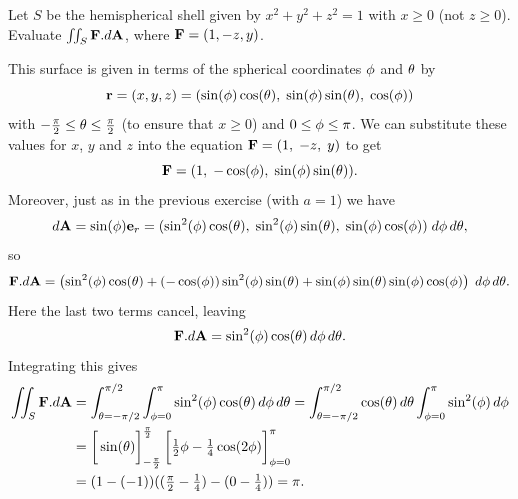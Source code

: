\documentclass[a4paper]{amsart}
\renewenvironment{solution}{\SolutionInline}{\endSolutionInline}
\begin{document}
\begin{exercise}
 Let $S$ be the hemispherical shell given by $x^2+y^2+z^2=1$ with
 $x\geq 0$ (not $z\geq 0$).  Evaluate $\iint_S\mathbf{F}.d\mathbf{A}$, where
 $\mathbf{F}=(1,-z,y)$.
\end{exercise}
\begin{solution}
 This surface is given in terms of the spherical coordinates $\phi$
 and $\theta$ by 
 \[ \mathbf{r} = (x,y,z) =
     (\sin(\phi)\cos(\theta),\;\sin(\phi)\sin(\theta),\;\cos(\phi))
 \]
 with $-\frac{\pi}{2}\leq\theta\leq\frac{\pi}{2}$ (to ensure that
 $x\geq 0$) and $0\leq\phi\leq\pi$.  We can substitute these values
 for $x$, $y$ and $z$ into the equation $\mathbf{F}=(1,\;-z,\;y)$ to get
 \[ \mathbf{F} = (1,\;-\cos(\phi),\;\sin(\phi)\sin(\theta)).
 \]
 Moreover, just as in the previous exercise (with $a=1$) we have 
 \[ d\mathbf{A}=\sin(\phi)\mathbf{e}_r
     = (\sin^2(\phi)\cos(\theta),\;
        \sin^2(\phi)\sin(\theta),\;
        \sin(\phi)\cos(\phi))\;d\phi\,d\theta,
 \]
 so 
 \[ \mathbf{F}.d\mathbf{A} = \left(
     \sin^2(\phi)\cos(\theta) + 
     (-\cos(\phi))\sin^2(\phi)\sin(\theta) +
     \sin(\phi)\sin(\theta)\sin(\phi)\cos(\phi)
    \right)\;d\phi\,d\theta.
 \]
 Here the last two terms cancel, leaving 
 \[ \mathbf{F}.d\mathbf{A}=\sin^2(\phi)\cos(\theta)\,d\phi\,d\theta. \]
 Integrating this gives
 \begin{align*}
  \iint_S\vF.d\vA
   &= \int_{\azi=-\pi/2}^{\pi/2}\int_{\zen=0}^\pi 
       \sin^2(\zen)\cos(\azi) \,d\zen\,d\azi 
    = \int_{\azi=-\pi/2}^{\pi/2}\cos(\azi)\,d\azi 
       \int_{\zen=0}^\pi\sin^2(\zen)\,d\zen \\
   &= \CH{\sin(\azi)}_{-\frac{\pi}{2}}^{\frac{\pi}{2}} 
       \CH{\tfrac{1}{2}\zen-\tfrac{1}{4}\cos(2\zen)}_{\phi=0}^\pi \\
   &= (1-(-1))((\tfrac{\pi}{2}-\tfrac{1}{4})-(0-\tfrac{1}{4})) 
    = \pi.
 \end{align*}
\end{solution}
\end{document}
